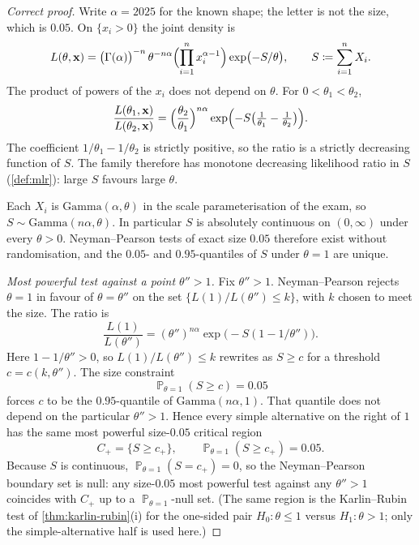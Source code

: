 \documentclass[11pt,a4paper]{article}
\DeclareMathOperator{\Pbb}{\mathbb{P}}
\begin{document}
\begin{proof}[Correct proof]
Write \( \alpha=2025 \) for the known shape; the letter is not the size, which is \( 0.05 \). On \( \{x_i>0\} \) the joint density is
\[
L(\theta,\mathbf{x})
=
\bigl(\Gamma(\alpha)\bigr)^{-n}\,
\theta^{-n\alpha}
\Bigl(\prod_{i=1}^{n}x_i^{\alpha-1}\Bigr)
\exp\bigl(-S/\theta\bigr),
\qquad
S
\coloneqq
\sum_{i=1}^{n}X_i.
\]
The product of powers of the \( x_i \) does not depend on \( \theta \). For \( 0<\theta_1<\theta_2 \),
\[
\frac{L(\theta_1,\mathbf{x})}{L(\theta_2,\mathbf{x})}
=
\Bigl(\frac{\theta_2}{\theta_1}\Bigr)^{n\alpha}
\exp\Bigl(-S\bigl(\tfrac{1}{\theta_1}-\tfrac{1}{\theta_2}\bigr)\Bigr).
\]
The coefficient \( 1/\theta_1-1/\theta_2 \) is strictly positive, so the ratio is a strictly decreasing function of \( S \). The family therefore has monotone decreasing likelihood ratio in \( S \) (\cref{def:mlr}): large \( S \) favours large \( \theta \).

Each \( X_i \) is \( \mathrm{Gamma}(\alpha,\theta) \) in the scale parameterisation of the exam, so \( S\sim\mathrm{Gamma}(n\alpha,\theta) \). In particular \( S \) is absolutely continuous on \( (0,\infty) \) under every \( \theta>0 \). Neyman--Pearson tests of exact size \( 0.05 \) therefore exist without randomisation, and the \( 0.05 \)- and \( 0.95 \)-quantiles of \( S \) under \( \theta=1 \) are unique.

\emph{Most powerful test against a point \( \theta''>1 \).}
Fix \( \theta''>1 \). Neyman--Pearson \citep[Theorem~8.1.1]{hogg2019} rejects \( \theta=1 \) in favour of \( \theta=\theta'' \) on the set \( \{L(1)/L(\theta'')\le k\} \), with \( k \) chosen to meet the size. The ratio is
\[
\frac{L(1)}{L(\theta'')}
=
(\theta'')^{n\alpha}
\exp\bigl(-S(1-1/\theta'')\bigr).
\]
Here \( 1-1/\theta''>0 \), so \( L(1)/L(\theta'')\le k \) rewrites as \( S\ge c \) for a threshold \( c=c(k,\theta'') \). The size constraint
\[
\Pbb_{\theta=1}(S\ge c)
=
0.05
\]
forces \( c \) to be the \( 0.95 \)-quantile of \( \mathrm{Gamma}(n\alpha,1) \). That quantile does not depend on the particular \( \theta''>1 \). Hence every simple alternative on the right of \( 1 \) has the same most powerful size-\( 0.05 \) critical region
\[
C_+
=
\{S\ge c_+\},
\qquad
\Pbb_{\theta=1}(S\ge c_+)
=
0.05.
\]
Because \( S \) is continuous, \( \Pbb_{\theta=1}(S=c_+)=0 \), so the Neyman--Pearson boundary set is null: any size-\( 0.05 \) most powerful test against any \( \theta''>1 \) coincides with \( C_+ \) up to a \( \Pbb_{\theta=1} \)-null set. (The same region is the Karlin--Rubin test of \cref{thm:karlin-rubin}(i) for the one-sided pair \( H_0:\theta\le 1 \) versus \( H_1:\theta>1 \); only the simple-alternative half is used here.)


\end{proof}
\end{document}
